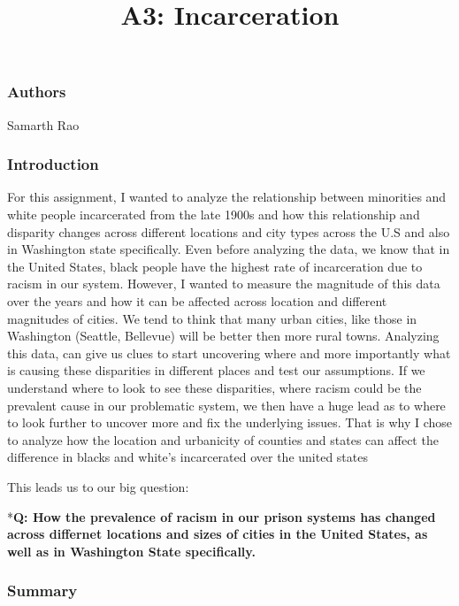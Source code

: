 \documentclass[
]{article}
\title{A3: Incarceration}
\author{}
\date{\vspace{-2.5em}}
\begin{document}
\maketitle

\hypertarget{authors}{%
\subsubsection{Authors}\label{authors}}

Samarth Rao

\hypertarget{introduction}{%
\subsubsection{Introduction}\label{introduction}}

For this assignment, I wanted to analyze the relationship between
minorities and white people incarcerated from the late 1900s and how
this relationship and disparity changes across different locations and
city types across the U.S and also in Washington state specifically.
Even before analyzing the data, we know that in the United States, black
people have the highest rate of incarceration due to racism in our
system. However, I wanted to measure the magnitude of this data over the
years and how it can be affected across location and different
magnitudes of cities. We tend to think that many urban cities, like
those in Washington (Seattle, Bellevue) will be better then more rural
towns. Analyzing this data, can give us clues to start uncovering where
and more importantly what is causing these disparities in different
places and test our assumptions. If we understand where to look to see
these disparities, where racism could be the prevalent cause in our
problematic system, we then have a huge lead as to where to look further
to uncover more and fix the underlying issues. That is why I chose to
analyze how the location and urbanicity of counties and states can
affect the difference in blacks and white's incarcerated over the united
states

This leads us to our big question:

*\textbf{Q: How the prevalence of racism in our prison systems has
changed across differnet locations and sizes of cities in the United
States, as well as in Washington State specifically.}

\hypertarget{summary}{%
\subsubsection{Summary}\label{summary}}
\end{document}
